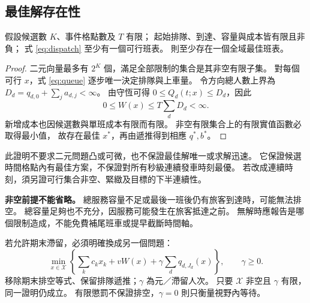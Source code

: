 \subsection{最佳解存在性}
\begin{theorem}[有限候選班表的最小值]
假設候選數 $K$、事件格點數及 $T$ 有限；
起始排隊、到達、容量與成本皆有限且非負；
式 \eqref{eq:dispatch} 至少有一個可行班表。
則至少存在一個全域最佳班表。
\label{thm:dispatch}
\end{theorem}
\begin{proof}
二元向量最多有 $2^K$ 個，滿足全部限制的集合是其非空有限子集。
對每個可行 $x$，式 \eqref{eq:queue} 逐步唯一決定排隊與上車量。
令方向總人數上界為
$D_d=q_{d,0}+\sum_j a_{d,j}<\infty$。
由守恆可得 $0\le Q_d(t;x)\le D_d$，因此
\[
0\le W(x)\le T\sum_dD_d<\infty.
\]
新增成本也因候選數與單班成本有限而有限。
非空有限集合上的有限實值函數必取得最小值，
故存在最佳 $x^*$，再由遞推得到相應 $q^*,b^*$。
\end{proof}

此證明不要求二元問題凸或可微，也不保證最佳解唯一或求解迅速。
它保證候選時間格點內有最佳方案，不保證對所有秒級連續發車時刻最優。
若改成連續時刻，須另證可行集合非空、緊緻及目標的下半連續性。

\textbf{非空前提不能省略。}
總服務容量不足或最後一班後仍有旅客到達時，可能無法排空。
總容量足夠也不充分，因服務可能發生在旅客抵達之前。
無解時應報告是哪個限制造成，不能免費補尾班車或提早截斷時間軸。

若允許期末滯留，必須明確換成另一個問題：
\begin{equation}
\min_{x\in\mathcal X}\left\{
\sum_kc_kx_k+vW(x)+\gamma\sum_d q_{d,J_d}(x)\right\},\qquad \gamma\ge0.
\label{eq:softterminal}
\end{equation}
移除期末排空等式、保留排隊遞推；$\gamma$ 為元／滯留人次。
只要 $\mathcal X$ 非空且 $\gamma$ 有限，同一證明仍成立。
有限懲罰不保證排空，$\gamma=0$ 則只衡量視野內等待。

